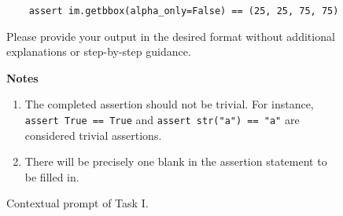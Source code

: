 \begin{figure}[t]
\begin{tcolorbox}[colback=blue!5!white, colframe=blue!75!black,title=Task I (Contextual)]
\begin{verbatim}
    assert im.getbbox(alpha_only=False) == (25, 25, 75, 75)
\end{verbatim}

Please provide your output in the desired format without additional explanations or step-by-step guidance.

\textbf{Notes}
\begin{enumerate}
    \item The completed assertion should not be trivial. For instance, \texttt{assert True == True} and \texttt{assert str("a") == "a"} are considered trivial assertions.
    \item There will be precisely one blank in the assertion statement to be filled in.
\end{enumerate}

\end{tcolorbox}

    \caption{Contextual prompt of Task I.}
\label{fig:task1ctx}
\end{figure}